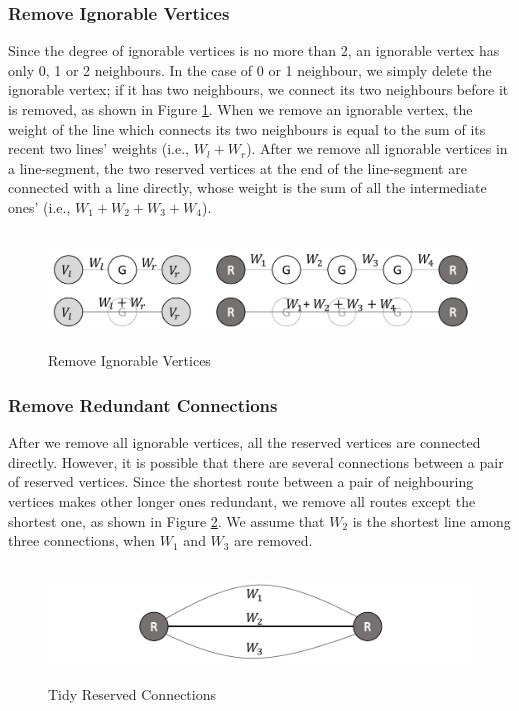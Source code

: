 \subsubsection{ Remove Ignorable Vertices}\label{subsubsec_RIV}

\noindent Since the degree of ignorable vertices is no more than 2, an ignorable vertex has only 0, 1 or 2 neighbours. In the case of 0 or 1 neighbour, we simply delete the ignorable vertex; if it has two neighbours, we connect its two neighbours before it is removed, as shown in Figure \ref{fig:RemoveIgnorableVertices}. When we remove an ignorable vertex, the weight of the line which connects its two neighbours is equal to the sum of its recent two lines' weights (i.e., $W_l+W_r$). After we remove all ignorable vertices in a line-segment, the two reserved vertices at the end of the line-segment are connected with a line directly, whose weight is the sum of all the intermediate ones' (i.e., $W_1+W_2+W_3+W_4$).

\begin{figure} [hbtp]
  \centering 
  \includegraphics[height=1.2in]{figures/F51RemoveIgnorableVertices.png}
  \caption{Remove Ignorable Vertices} 
  \label{fig:RemoveIgnorableVertices} %
\end{figure}

\subsubsection{ Remove Redundant Connections}\label{subsubsec_RRC}

\noindent After we remove all ignorable vertices, all the reserved vertices are connected directly. However, it is possible that there are several connections between a pair of reserved vertices. Since the shortest route between a pair of neighbouring vertices makes other longer ones redundant, we remove all routes except the shortest one, as shown in Figure \ref{fig:F52TidyReservedConnections}. We assume that $W_2$ is the shortest line among three connections, when $W_1$ and $W_3$ are removed.

\begin{figure} [hbtp]
  \centering 
  \includegraphics[height=1.2in]{figures/F52TidyReservedConnections.png}
  \caption{Tidy Reserved Connections} 
  \label{fig:F52TidyReservedConnections} %
\end{figure}

